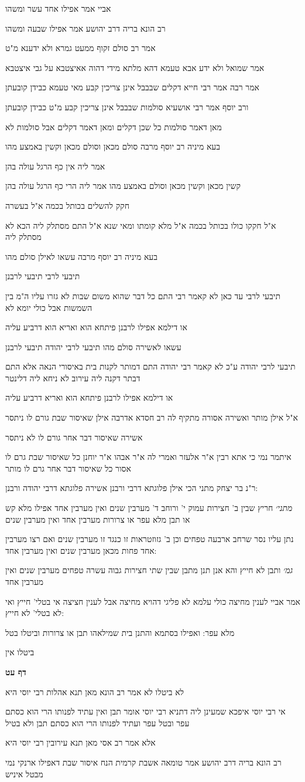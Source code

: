 \documentclass[12pt, openany]{book}
\newcommand{\sethebfont}{
\fontsize{10.5pt}{21.0pt} \selectfont
}
\newcommand{\textblock}[1]{
{\sethebfont #1\\}	
}
\newcommand{\sectname}{}
\newcommand{\newsection}[1]{
	\addcontentsline{toc}{section}{#1}
	\renewcommand{\sectname}{#1}	
	\vspace{-\baselineskip}
	\begin{center}
		\textbf{%
\fontsize{16pt}{16pt}\selectfont
			#1}
	\end{center}
	\vspace{-\baselineskip}
	\nopagebreak
}
\begin{document}
\textblock{אביי אמר אפילו אחד עשר ומשהו}
\textblock{רב הונא בריה דרב יהושע אמר אפילו שבעה ומשהו}
\textblock{אמר רב סולם זקוף ממעט גמרא ולא ידענא מ"ט}
\textblock{אמר שמואל ולא ידע אבא טעמא דהא מלתא מידי דהוה אאיצטבא על גבי איצטבא}
\textblock{אמר רבה אמר רבי חייא דקלים שבבבל אינן צריכין קבע מאי טעמא כבידן קובעתן}
\textblock{ורב יוסף אמר רבי אושעיא סולמות שבבבל אינן צריכין קבע מ"ט כבידן קובעתן}
\textblock{מאן דאמר סולמות כל שכן דקלים ומאן דאמר דקלים אבל סולמות לא}
\textblock{בעא מיניה רב יוסף מרבה סולם מכאן וסולם מכאן וקשין באמצע מהו}
\textblock{אמר ליה אין כף הרגל עולה בהן}
\textblock{קשין מכאן וקשין מכאן וסולם באמצע מהו אמר ליה הרי כף הרגל עולה בהן}
\textblock{חקק להשלים בכותל בכמה א"ל בעשרה}
\textblock{א"ל חקקו כולו בכותל בכמה א"ל מלא קומתו ומאי שנא א"ל התם מסתלק ליה הכא לא מסתלק ליה}
\textblock{בעא מיניה רב יוסף מרבה עשאו לאילן סולם מהו}
\textblock{תיבעי לרבי תיבעי לרבנן}
\textblock{תיבעי לרבי עד כאן לא קאמר רבי התם כל דבר שהוא משום שבות לא גזרו עליו ה"מ בין השמשות אבל כולי יומא לא}
\textblock{או דילמא אפילו לרבנן פיתחא הוא ואריא הוא דרביע עליה}
\textblock{עשאו לאשירה סולם מהו תיבעי לרבי יהודה תיבעי לרבנן}
\textblock{תיבעי לרבי יהודה ע"כ לא קאמר רבי יהודה התם דמותר לקנות בית באיסורי הנאה אלא התם דבתר דקנה ליה עירוב לא ניחא ליה דלינטר}
\textblock{או דילמא אפילו לרבנן פיתחא הוא ואריא דרביע עליה}
\textblock{א"ל אילן מותר ואשירה אסורה מתקיף לה רב חסדא אדרבה אילן שאיסור שבת גורם לו ניתסר}
\textblock{אשירה שאיסור דבר אחר גורם לו לא ניתסר}
\textblock{איתמר נמי כי אתא רבין א"ר אלעזר ואמרי לה א"ר אבהו א"ר יוחנן כל שאיסור שבת גרם לו אסור כל שאיסור דבר אחר גרם לו מותר}
\textblock{ר"נ בר יצחק מתני הכי אילן פלוגתא דרבי ורבנן אשירה פלוגתא דרבי יהודה ורבנן:}
\textblock{{\large\emph{מתני׳}} חריץ שבין ב' חצירות עמוק י' ורוחב ד' מערבין שנים ואין מערבין אחד אפילו מלא קש או תבן מלא עפר או צרורות מערבין אחד ואין מערבין שנים}
\textblock{נתן עליו נסר שרחב ארבעה טפחים וכן ב' גזוזטראות זו כנגד זו מערבין שנים ואם רצו מערבין אחד פחות מכאן מערבין שנים ואין מערבין אחד:}
\textblock{{\large\emph{גמ׳}} ותבן לא חייץ והא אנן תנן מתבן שבין שתי חצירות גבוה עשרה טפחים מערבין שנים ואין מערבין אחד}
\textblock{אמר אביי לענין מחיצה כולי עלמא לא פליגי דהויא מחיצה אבל לענין חציצה אי בטלי' חייץ ואי לא בטלי' לא חייץ:}
\textblock{מלא עפר: ואפילו בסתמא והתנן בית שמילאהו תבן או צרורות וביטלו בטל}
\textblock{ביטלו אין}
\newsection{דף עט}
\textblock{לא ביטלו לא אמר רב הונא מאן תנא אהלות רבי יוסי היא}
\textblock{אי רבי יוסי איפכא שמעינן ליה דתניא רבי יוסי אומר תבן ואין עתיד לפנותו הרי הוא כסתם עפר ובטל עפר ועתיד לפנותו הרי הוא כסתם תבן ולא בטיל}
\textblock{אלא אמר רב אסי מאן תנא עירובין רבי יוסי היא}
\textblock{רב הונא בריה דרב יהושע אמר טומאה אשבת קרמית הנח איסור שבת דאפילו ארנקי נמי מבטל איניש}
\end{document}
